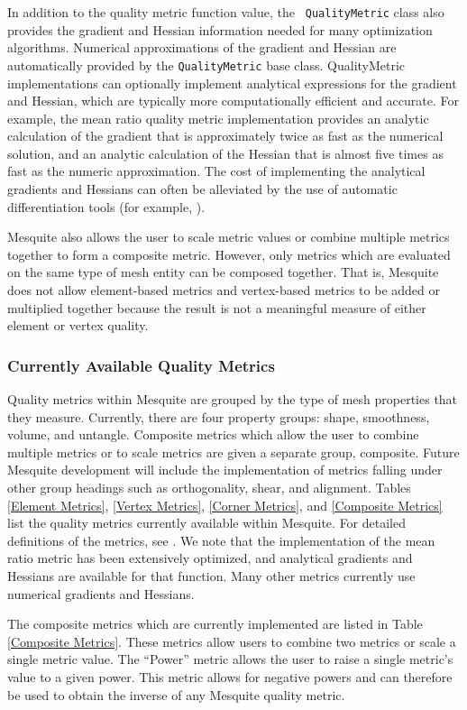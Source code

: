 In addition to the quality metric function value, the {\tt
QualityMetric} class also provides the gradient and Hessian
information needed for many optimization algorithms.  Numerical
approximations of the gradient and Hessian are automatically provided
by the \texttt{QualityMetric} base class.  QualityMetric implementations
can optionally
implement analytical expressions for the gradient and Hessian, which are 
typically more computationally efficient and accurate.  For example, the
mean ratio
quality metric implementation provides an analytic calculation of the gradient 
that is approximately twice as fast as the numerical solution, and an analytic
calculation of the Hessian that is almost five times as fast as the
numeric approximation.  The
cost of implementing the analytical gradients and Hessians can often
be alleviated by the use of automatic differentiation tools
(for example, \cite{bischofadic}).

Mesquite also allows the user to scale metric values or combine
multiple metrics together to form a composite metric.  However, only
metrics which are evaluated on the same type of mesh entity can be
composed together.  That is, Mesquite does not allow element-based
metrics and vertex-based metrics to be added or multiplied together
because the result is not a meaningful measure of either element or
vertex quality.

\subsubsection{Currently Available Quality Metrics}  
Quality metrics within
Mesquite are grouped by the type of mesh properties that they measure.
Currently, there are four property groups: shape, smoothness, volume,
and untangle.  Composite metrics which allow the user to combine
multiple metrics or to scale metrics are given a separate group,
composite.  Future Mesquite development will include the
implementation of metrics falling under other group headings such as
orthogonality, shear, and alignment.  Tables \ref{Element Metrics},
\ref{Vertex Metrics}, \ref{Corner Metrics}, and \ref{Composite Metrics}
list the quality metrics currently available within Mesquite.  For
detailed definitions of the metrics, see \cite{Kn01}.  We note that
the implementation of the mean ratio metric has been extensively
optimized, and analytical gradients and Hessians are available for
that function.  Many other metrics currently use numerical gradients and
Hessians.

The composite metrics which are currently implemented are listed
in Table \ref{Composite Metrics}.  These metrics allow users to
combine two metrics or scale a single metric value.
The ``Power'' metric allows the user to raise a single metric's
value to a given power. This metric allows for negative powers
and can therefore be used to obtain the inverse of any Mesquite
quality metric.  

